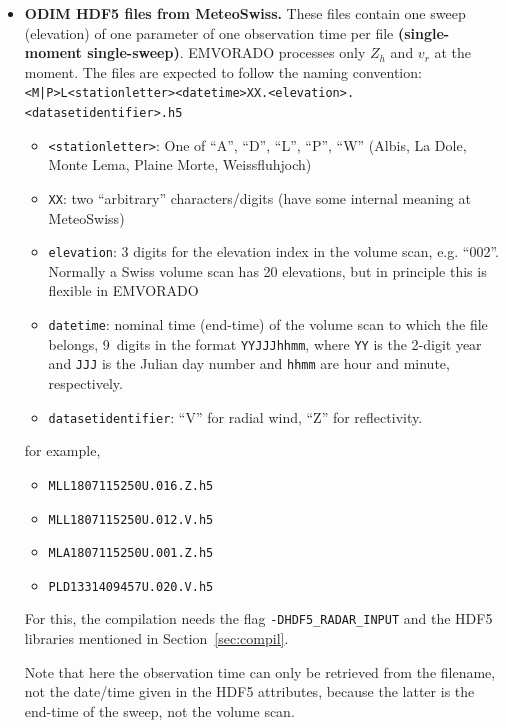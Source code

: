 \documentclass[10pt,a4paper,twoside,headinclude,footinclude,parskip=half]{scrartcl}
\newcommand{\srcform}[1]{\mbox{\texttt{#1}}\xspace}%
\begin{document}
\begin{itemize}
\item \textbf{ODIM HDF5 files from MeteoSwiss.} These files contain one sweep (elevation) of one parameter of one observation time per file \textbf{(single-moment single-sweep)}.
  EMVORADO processes only $Z_h$ and $v_r$ at the moment. The files are expected to follow the naming convention:\\[0.5em]
  \verb$<M|P>L<stationletter><datetime>XX.<elevation>.<datasetidentifier>.h5$
  \begin{itemize}
  \item \verb|<stationletter>|: One of ``A'', ``D'', ``L'', ``P'', ``W'' (Albis, La Dole, Monte Lema, Plaine Morte, Weissfluhjoch)
  \item \verb|XX|: two ``arbitrary'' characters/digits (have some internal meaning at MeteoSwiss)
  \item \verb|elevation|: 3 digits for the elevation index in the volume scan, e.g. ``002''. Normally a Swiss volume scan has 20 elevations, but in principle this
    is flexible in EMVORADO
  \item \verb|datetime|: nominal time (end-time) of the volume scan to which the file belongs,
    9~digits in the format \verb|YYJJJhhmm|, where \verb|YY| is the 2-digit year and \verb|JJJ| is the Julian
    day number and \verb|hhmm| are hour and minute, respectively.
  \item \verb|datasetidentifier|: ``V'' for radial wind, ``Z'' for reflectivity.
  \end{itemize}
  for example,
  \begin{itemize}
  \item \verb|MLL1807115250U.016.Z.h5|
  \item \verb|MLL1807115250U.012.V.h5|
  \item \verb|MLA1807115250U.001.Z.h5|
  \item \verb|PLD1331409457U.020.V.h5|
  \end{itemize}
  For this, the compilation needs the flag \srcform{-DHDF5_RADAR_INPUT} and the HDF5 libraries mentioned in Section~\ref{sec:compil}.

  Note that here the observation time can only be retrieved from the filename, not the date/time given in the HDF5 attributes, because the latter is the end-time of the sweep, not the volume scan.


\end{itemize}
\end{document}
